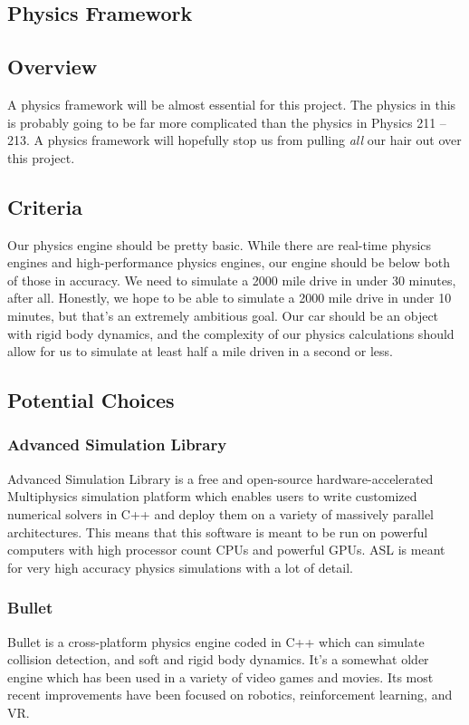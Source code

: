\documentclass[onecolumn, draftclsnofoot,10pt, compsoc]{IEEEtran}
\begin{document}
\begin{singlespace}

\section{Physics Framework}

\subsection{Overview}
A physics framework will be almost essential for this project.
The physics in this is probably going to be far more complicated than the physics in Physics 211 – 213.
A physics framework will hopefully stop us from pulling \textit{all} our hair out over this project.

\subsection{Criteria}
Our physics engine should be pretty basic.
While there are real-time physics engines and high-performance physics engines, our engine should be below both of those in accuracy.
We need to simulate a 2000 mile drive in under 30 minutes, after all.
Honestly, we hope to be able to simulate a 2000 mile drive in under 10 minutes, but that's an extremely ambitious goal.
Our car should be an object with rigid body dynamics, and the complexity of our physics calculations should allow for us to simulate at least half a mile driven in a second or less.

\subsection{Potential Choices}

\subsubsection{Advanced Simulation Library}
Advanced Simulation Library is a free and open-source hardware-accelerated Multiphysics simulation platform which enables users to write customized numerical solvers in C++ and deploy them on a variety of massively parallel architectures.
This means that this software is meant to be run on powerful computers with high processor count CPUs and powerful GPUs.
ASL is meant for very high accuracy physics simulations with a lot of detail.
\cite{AdvancedSimulationLibrary}

\subsubsection{Bullet}
Bullet is a cross-platform physics engine coded in C++ which can simulate collision detection, and soft and rigid body dynamics.
It's a somewhat older engine which has been used in a variety of video games and movies.
Its most recent improvements have been focused on robotics, reinforcement learning, and VR.
\cite{Bullet}


\end{singlespace}
\end{document}

